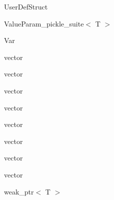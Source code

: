\begin{CompactList}
\begin{CompactList}
\item {}
\end{CompactList}
\item User\-Def\-Struct\item Value\-Param\_\-pickle\_\-suite$<$ T $>$\item Var\item vector\begin{CompactList}
\item {}
\end{CompactList}
\item vector\begin{CompactList}
\item {}
\end{CompactList}
\item vector\begin{CompactList}
\item {}
\end{CompactList}
\item vector\begin{CompactList}
\item {}
\end{CompactList}
\item vector\item vector\begin{CompactList}
\item {}
\end{CompactList}
\item vector\begin{CompactList}
\item {}
\end{CompactList}
\item vector\begin{CompactList}
\item {}
\end{CompactList}
\item weak\_\-ptr$<$ T $>$\end{CompactList}
